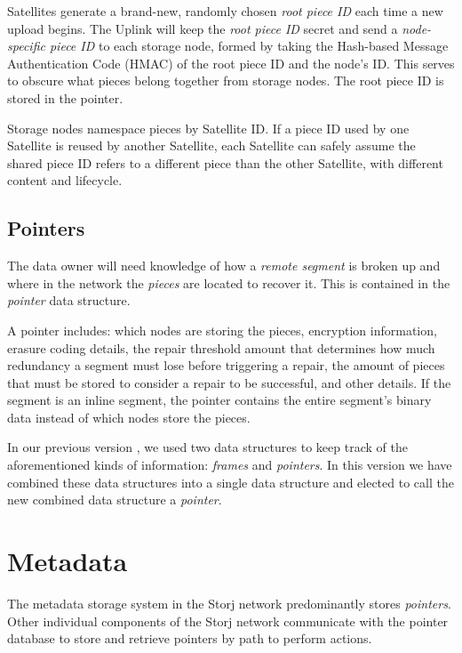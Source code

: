 \documentclass[8pt,fleqn,openany]{book}
\begin{document}
Satellites generate a brand-new, randomly chosen {\em root piece ID} each time
a new upload begins. The Uplink will keep the {\em root piece ID} secret and send
a {\em node-specific piece ID} to each storage node, formed by taking the Hash-based
Message Authentication Code (HMAC) of the root piece ID and the node's ID.
This serves to obscure what pieces belong together from storage nodes.
The root piece ID is stored in the pointer.

Storage nodes namespace pieces by Satellite ID. If a piece ID used by one
Satellite is reused by another Satellite, each Satellite can safely assume the shared piece ID refers
to a different piece than the other Satellite, with different content and lifecycle.

\subsection{Pointers}

The data owner will need knowledge of how a {\em remote segment} is broken up and
where in the network the {\em pieces} are located to recover it. This is contained
in the {\em pointer} data structure.

A pointer includes: which nodes are storing the pieces,
encryption information, erasure coding details,
the repair threshold amount that determines how much redundancy a segment
must lose before triggering a repair, the amount of pieces that must be
stored to consider a repair to be successful, and other details. If the
segment is an inline segment, the pointer contains the entire segment's binary
data instead of which nodes store the pieces.

In our previous version \cite{storj-v2}, we used two data structures to keep
track of the aforementioned kinds of information:
{\em frames} and {\em pointers}.
In this version we have combined these data structures into a single data
structure and elected to call the new combined data structure a {\em pointer}.

\section{Metadata}\label{sec:concrete-metadata}

The metadata storage system in the Storj network predominantly stores
{\em pointers}. Other individual components of the Storj network communicate with
the pointer database to store and retrieve pointers by path to perform actions.
\end{document}
